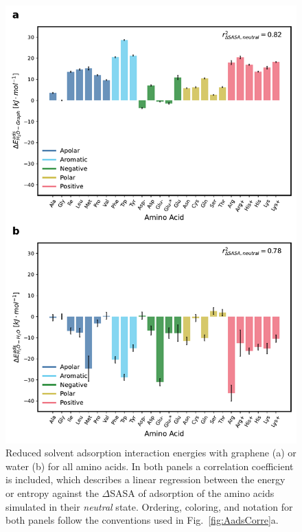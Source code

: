 \documentclass[journal=jcisd8,manuscript=article,layout=twocolumn]{achemso}
\begin{document}
\begin{figure}[htbp]
\centerline{\includegraphics[width=\columnwidth]{figures/Fig6.pdf}}
\caption[]{\label{fig:EneH2OCorr}Reduced solvent adsorption interaction energies with graphene (a) or water (b) for all amino acids. In both panels a correlation coefficient is included, which describes a linear regression between the energy or entropy against the $\Delta$SASA of adsorption of the amino acids simulated in their \textit{neutral} state. Ordering, coloring, and notation for both panels follow the conventions used in Fig.~\ref{fig:AadsCorre}a.}
\end{figure}
\end{document}
